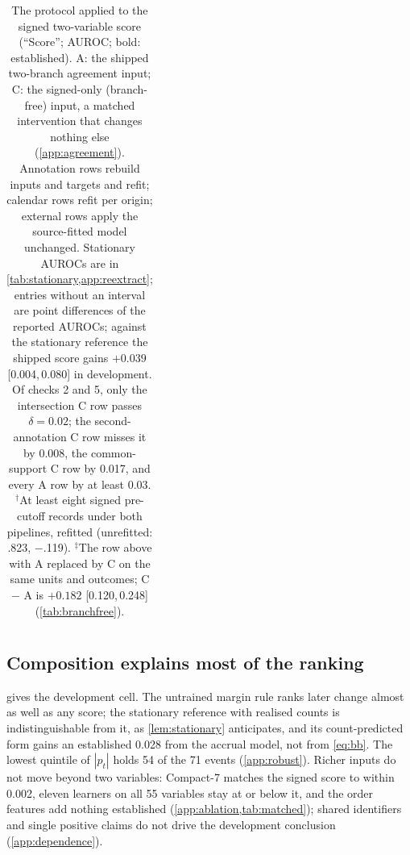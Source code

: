 \documentclass[11pt]{article}
\newcommand{\compact}{Compact-7\xspace}
\newcommand{\ci}[2]{[#1,\,#2]}
\begin{document}
\begin{table}[!t]
\begin{tabular}{@{}lllccll@{}}
\bottomrule
\end{tabular}
\caption{The protocol applied to the signed two-variable score (``Score''; AUROC; bold:
established). A: the shipped two-branch agreement input; C: the signed-only (branch-free) input,
a matched intervention that changes nothing else (\cref{app:agreement}). Annotation rows rebuild
inputs and targets and refit; calendar rows refit per origin; external rows apply the source-fitted
model unchanged. Stationary AUROCs are in \cref{tab:stationary,app:reextract}; entries without an
interval are point differences of the reported AUROCs; against the stationary reference the
shipped score gains $+0.039$ \ci{0.004}{0.080} in development. Of checks 2 and 5, only the
intersection C row passes $\delta=0.02$; the second-annotation C row misses it by 0.008, the
common-support C row by 0.017, and every A row by at least 0.03. $^{\dagger}$At least eight signed
pre-cutoff records under both pipelines, refitted (unrefitted: .823, $-$.119). $^{\ddagger}$The
row above with A replaced by C on the same units and outcomes; C $-$ A is $+0.182$
\ci{0.120}{0.248} (\cref{tab:branchfree}).}
\label{tab:protocol}
\end{table}

\subsection{Composition explains most of the ranking}
\label{sec:pred}
 gives the development cell. The untrained margin rule ranks later change almost as
well as any score; the stationary reference with realised counts is indistinguishable from it, as
\cref{lem:stationary} anticipates, and its count-predicted form gains an established 0.028 from the
accrual model, not from \cref{eq:bb}. The lowest quintile of $|p_t|$ holds 54 of the 71 events
(\cref{app:robust}). Richer inputs do not move beyond two variables: \compact matches
the signed score to within 0.002, eleven learners on all 55 variables stay at or below it, and the
order features add nothing established (\cref{app:ablation,tab:matched}); shared
identifiers and single positive claims do not drive the development conclusion (\cref{app:dependence}).
\end{document}
